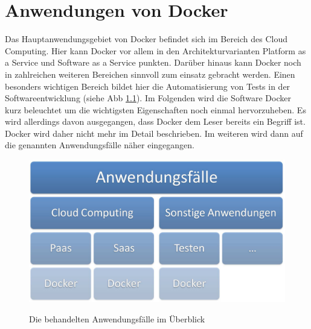 \chapter{Anwendungen von Docker}
\label{cha:anwendungen_von_docker}
Das Hauptanwendungsgebiet von Docker befindet sich im Bereich des Cloud Computing. Hier kann Docker vor allem in den Architekturvarianten Platform as a Service und Software as a Service punkten. Darüber hinaus kann Docker noch in zahlreichen weiteren Bereichen sinnvoll zum einsatz gebracht werden. Einen besonders wichtigen Bereich bildet hier die Automatisierung von Tests in der Softwareentwicklung (siehe Abb \ref{fig:anwendungsfaelle}).
Im Folgenden wird die Software Docker kurz beleuchtet um die wichtigsten Eigenschaften noch einmal hervorzuheben. Es wird allerdings davon ausgegangen, dass Docker dem Leser bereits ein Begriff ist. Docker wird daher nicht mehr im Detail beschrieben. Im weiteren wird dann auf die genannten Anwendungsfälle näher eingegangen.
\begin{figure}[htbp]
  \centering  
  \includegraphics[scale=0.7]{img/anwaendungsfaelle.jpg}\\
  \caption{Die behandelten Anwendungsfälle im Überblick}
  \label{fig:anwendungsfaelle}
\end{figure}

